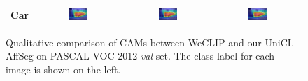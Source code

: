 \begin{figure}[ht]
\begin{tabular}{c c c c}
    \textbf{Car}         & \includegraphics[width=0.23\textwidth]{figures/qualitative_analysis/test_cam/2010_005860_6.jpg} & \includegraphics[width=0.23\textwidth]{figures/qualitative_analysis/test_cam/2010_005860_6.jpg} & \includegraphics[width=0.23\textwidth]{figures/qualitative_analysis/test_cam/2010_005860_6.jpg} \\
  \end{tabular}

  \caption{Qualitative comparison of CAMs between WeCLIP and our UniCL-AffSeg on PASCAL VOC 2012 \textit{val} set. The class label for each image is shown on the left.}
  \label{fig:qualitative_comparison_cam_val}
\end{figure}

